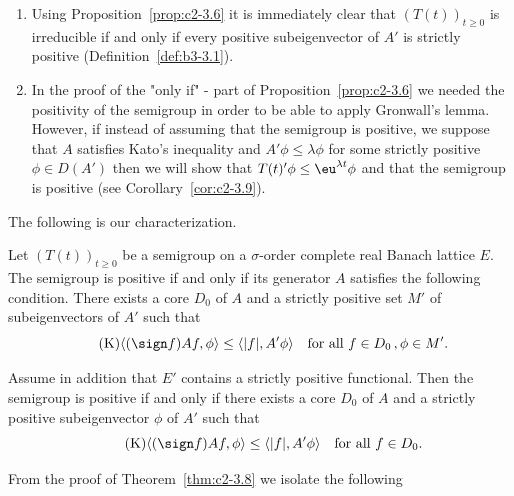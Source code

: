 \begin{remark}\label{rem:c2-3.7}
\begin{enumerate}[\upshape (i), wide, labelindent=.25em]%
\item \label{rem:c2-3.7-1}
Using Proposition~\ref{prop:c2-3.6} it is immediately clear that
$(T(t))_{t \geq 0}$ is irreducible if and only if every positive subeigenvector
of\/ $A'$ is strictly positive (\cf Definition~\ref{def:b3-3.1}). 

\item \label{rem:c2-3.7-2}
In the proof of the "only if" - part of Proposition~\ref{prop:c2-3.6} we needed the
positivity of the semigroup in order to be able to apply Gronwall's
lemma.
However, if instead of assuming that the semigroup is positive, 
we suppose that $A$ satisfies Kato's inequality and $A'\phi \leq \lambda\phi$ for some strictly positive $\phi \in D(A')$ then we will show that $T(t)'\phi \leq
\eu^{\lambda t} \phi$ and that the semigroup is positive (see Corollary~\ref{cor:c2-3.9}).
\end{enumerate}
\end{remark}
The following is our characterization.
\begin{theorem}\label{thm:c2-3.8}
Let $(T(t))_{t \geq 0}$ be a semigroup on a $\sigma$-order complete real Banach lattice $E$. 
The semigroup is positive if and only if its generator $A$ satisfies the following condition.
There exists a core $D_{0}$ of\/ $A$ and a strictly positive set $M'$ of subeigenvectors of\/ $A'$ such that
\begin{equation}\label{eq:c2-K4} \tag{K}
\langle(\sign f) Af,\phi \rangle \leq \langle|f|,A'\phi\rangle \quad \text{for all } f \in D_{0} \, ,  \phi \in M'.
\end{equation}
\end{theorem}
\begin{corollary}\label{cor:c2-3.9}
Assume in addition that $E'$ contains a strictly positive functional. 
Then the semigroup is positive if and only if there
exists a core $D_{0}$ of\/ $A$ and a strictly positive subeigenvector $\phi$
of\/ $A'$ such that
\begin{equation}\label{eq:c2-K5} \tag{K}
\langle(\sign f) Af,\phi \rangle \leq \langle|f|,A'\phi\rangle \quad \text{for all } f \in D_{0}.
\end{equation}
\end{corollary}
From the proof of Theorem~\ref{thm:c2-3.8}   we isolate the following
